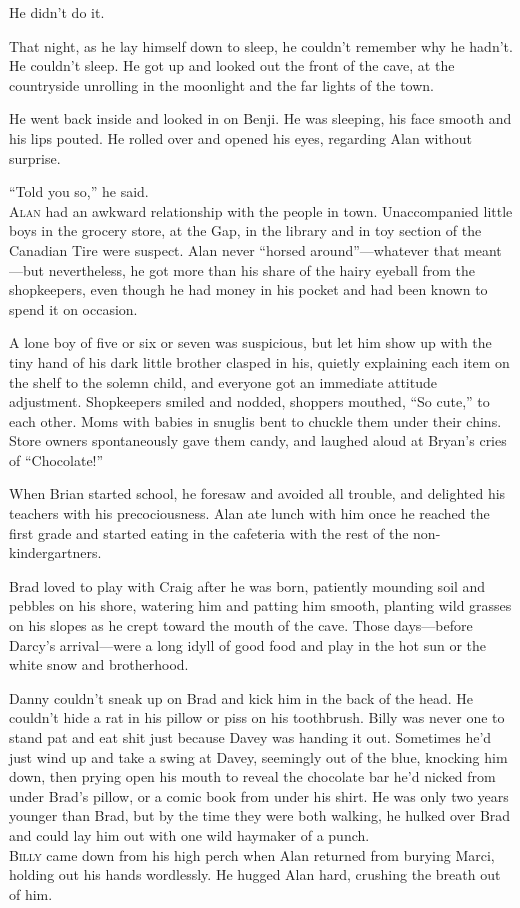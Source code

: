 \documentclass{article}
\begin{document}
He didn't do it.

That night, as he lay himself down to sleep, he couldn't remember why
he hadn't.  He couldn't sleep.  He got up and looked out the front of
the cave, at the countryside unrolling in the moonlight and the far
lights of the town.

He went back inside and looked in on Benji.  He was sleeping, his face
smooth and his lips pouted.  He rolled over and opened his eyes,
regarding Alan without surprise.

``Told you so,'' he said.
\\
\lettrine[lines=3, lhang=.5, nindent=0pt, findent=2pt]{A}{lan} had an awkward relationship with the people in town. 
Unaccompanied little boys in the grocery store, at the Gap, in the
library and in toy section of the Canadian Tire were suspect.  Alan
never ``horsed around''---whatever that meant---but nevertheless, he
got more than his share of the hairy eyeball from the shopkeepers,
even though he had money in his pocket and had been known to spend it
on occasion.

A lone boy of five or six or seven was suspicious, but let him show up
with the tiny hand of his dark little brother clasped in his, quietly
explaining each item on the shelf to the solemn child, and everyone
got an immediate attitude adjustment.  Shopkeepers smiled and nodded,
shoppers mouthed, ``So cute,'' to each other.  Moms with babies in
snuglis bent to chuckle them under their chins.  Store owners
spontaneously gave them candy, and laughed aloud at Bryan's cries of
``Chocolate!''

When Brian started school, he foresaw and avoided all trouble, and
delighted his teachers with his precociousness.  Alan ate lunch with
him once he reached the first grade and started eating in the
cafeteria with the rest of the non-kindergartners.

Brad loved to play with Craig after he was born, patiently mounding
soil and pebbles on his shore, watering him and patting him smooth,
planting wild grasses on his slopes as he crept toward the mouth of
the cave.  Those days---before Darcy's arrival---were a long idyll of
good food and play in the hot sun or the white snow and brotherhood.

Danny couldn't sneak up on Brad and kick him in the back of the head. 
He couldn't hide a rat in his pillow or piss on his toothbrush.  Billy
was never one to stand pat and eat shit just because Davey was handing
it out.  Sometimes he'd just wind up and take a swing at Davey,
seemingly out of the blue, knocking him down, then prying open his
mouth to reveal the chocolate bar he'd nicked from under Brad's
pillow, or a comic book from under his shirt.  He was only two years
younger than Brad, but by the time they were both walking, he hulked
over Brad and could lay him out with one wild haymaker of a punch.
\\
\lettrine[lines=3, lhang=.5, nindent=0pt, findent=2pt]{B}{illy} came down from his high perch when Alan returned from burying
Marci, holding out his hands wordlessly.  He hugged Alan hard,
crushing the breath out of him.
\end{document}
